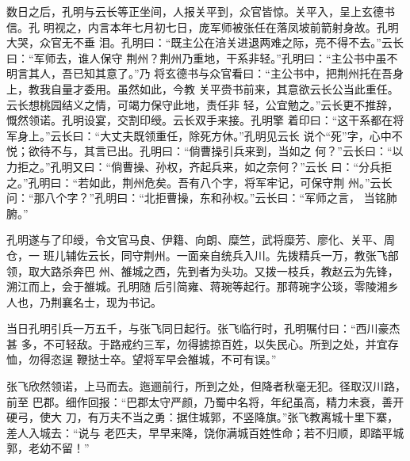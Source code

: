数日之后，孔明与云长等正坐间，人报关平到，众官皆惊。关平入，呈上玄德书信。孔
明视之，内言本年七月初七日，庞军师被张任在落凤坡前箭射身故。孔明大哭，众官无不垂
泪。孔明曰：“既主公在涪关进退两难之际，亮不得不去。”云长曰：“军师去，谁人保守
荆州？荆州乃重地，干系非轻。”孔明曰：“主公书中虽不明言其人，吾已知其意了。”乃
将玄德书与众官看曰：“主公书中，把荆州托在吾身上，教我自量才委用。虽然如此，今教
关平赍书前来，其意欲云长公当此重任。云长想桃园结义之情，可竭力保守此地，责任非
轻，公宜勉之。”云长更不推辞，慨然领诺。孔明设宴，交割印绶。云长双手来接。孔明擎
着印曰：“这干系都在将军身上。”云长曰：“大丈夫既领重任，除死方休。”孔明见云长
说个“死”字，心中不悦；欲待不与，其言已出。孔明曰：“倘曹操引兵来到，当如之
何？”云长曰：“以力拒之。”孔明又曰：“倘曹操、孙权，齐起兵来，如之奈何？”云长
曰：“分兵拒之。”孔明曰：“若如此，荆州危矣。吾有八个字，将军牢记，可保守荆
州。”云长问：“那八个字？”孔明曰：“北拒曹操，东和孙权。”云长曰：“军师之言，
当铭肺腑。”

孔明遂与了印绶，令文官马良、伊籍、向朗、糜竺，武将糜芳、廖化、关平、周仓，一
班儿辅佐云长，同守荆州。一面亲自统兵入川。先拨精兵一万，教张飞部领，取大路杀奔巴
州、雒城之西，先到者为头功。又拨一枝兵，教赵云为先锋，溯江而上，会于雒城。孔明随
后引简雍、蒋琬等起行。那蒋琬字公琰，零陵湘乡人也，乃荆襄名士，现为书记。

当日孔明引兵一万五千，与张飞同日起行。张飞临行时，孔明嘱付曰：“西川豪杰甚
多，不可轻敌。于路戒约三军，勿得掳掠百姓，以失民心。所到之处，并宜存恤，勿得恣逞
鞭挞士卒。望将军早会雒城，不可有误。”

张飞欣然领诺，上马而去。迤逦前行，所到之处，但降者秋毫无犯。径取汉川路，前至
巴郡。细作回报：“巴郡太守严颜，乃蜀中名将，年纪虽高，精力未衰，善开硬弓，使大
刀，有万夫不当之勇：据住城郭，不竖降旗。”张飞教离城十里下寨，差人入城去：“说与
老匹夫，早早来降，饶你满城百姓性命；若不归顺，即踏平城郭，老幼不留！”

